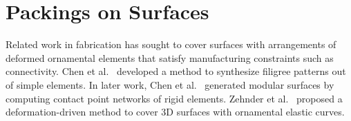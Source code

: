 \section{Packings on Surfaces}
Related work in fabrication has sought to cover surfaces with
arrangements of deformed ornamental elements that satisfy manufacturing
constraints such as connectivity.  Chen et al.~\cite{Chen2016}
developed a method to synthesize filigree patterns out of simple elements. 
In later work, Chen et al.~\cite{Chen2017}
generated modular surfaces by computing 
contact point networks of rigid elements.
Zehnder et al.~\cite{Zehnder2016} proposed a deformation-driven method to cover
3D surfaces with ornamental elastic curves.



